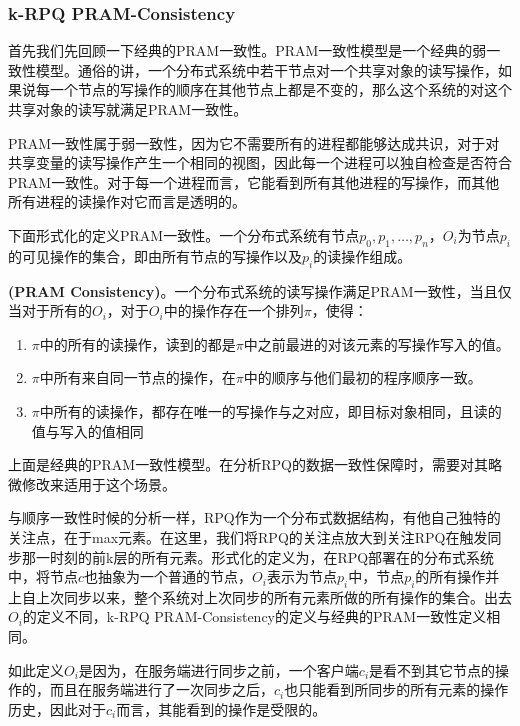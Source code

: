 		\subsubsection{k-RPQ PRAM-Consistency}
			\par 首先我们先回顾一下经典的PRAM一致性。PRAM一致性模型是一个经典的弱一致性模型\cite{lipton1988pram}\cite{Steinke:2004:UTS:1017460.1017464}。通俗的讲，一个分布式系统中若干节点对一个共享对象的读写操作，如果说每一个节点的写操作的顺序在其他节点上都是不变的，那么这个系统的对这个共享对象的读写就满足PRAM一致性。
			\par PRAM一致性属于弱一致性，因为它不需要所有的进程都能够达成共识，对于对共享变量的读写操作产生一个相同的视图，因此每一个进程可以独自检查是否符合PRAM一致性。对于每一个进程而言，它能看到所有其他进程的写操作，而其他所有进程的读操作对它而言是透明的。
			\par 下面形式化的定义PRAM一致性。一个分布式系统有节点$p_0,p_1,\dots,p_n$，$O_i$为节点$p_i$的可见操作的集合，即由所有节点的写操作以及$p_i$的读操作组成。
			\begin{definition}
				\textbf{(PRAM Consistency)}。一个分布式系统的读写操作满足PRAM一致性，当且仅当对于所有的$O_i$，对于$O_i$中的操作存在一个排列$\pi$，使得：
				\begin{enumerate}
					\item $\pi$中的所有的读操作，读到的都是$\pi$中之前最进的对该元素的写操作写入的值。
					\item $\pi$中所有来自同一节点的操作，在$\pi$中的顺序与他们最初的程序顺序一致。
					\item $\pi$中所有的读操作，都存在唯一的写操作与之对应，即目标对象相同，且读的值与写入的值相同
				\end{enumerate}
			\end{definition}
			\par 上面是经典的PRAM一致性模型。在分析RPQ的数据一致性保障时，需要对其略微修改来适用于这个场景。
			\par 与顺序一致性时候的分析一样，RPQ作为一个分布式数据结构，有他自己独特的关注点，在于max元素。在这里，我们将RPQ的关注点放大到关注RPQ在触发同步那一时刻的前k层的所有元素。形式化的定义为，在RPQ部署在的分布式系统中，将节点$c$也抽象为一个普通的节点，$O_i$表示为节点$p_i$中，节点$p_i$的所有操作并上自上次同步以来，整个系统对上次同步的所有元素所做的所有操作的集合。出去$O_i$的定义不同，k-RPQ PRAM-Consistency的定义与经典的PRAM一致性定义相同。
			\par 如此定义$O_i$是因为，在服务端进行同步之前，一个客户端$c_i$是看不到其它节点的操作的，而且在服务端进行了一次同步之后，$c_i$也只能看到所同步的所有元素的操作历史，因此对于$c_i$而言，其能看到的操作是受限的。
